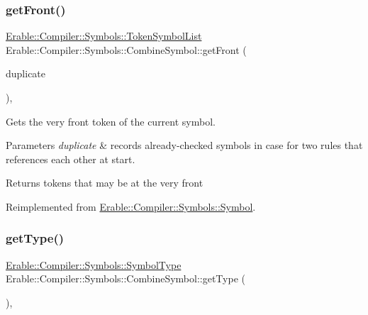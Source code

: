 \mbox{\label{struct_erable_1_1_compiler_1_1_symbols_1_1_combine_symbol_a453595cfd8eecc98d7d6589d78068f1a}} 
\subsubsection{\texorpdfstring{getFront()}{getFirst()}}
{\footnotesize\ttfamily \mbox{\hyperlink{namespace_erable_1_1_compiler_1_1_symbols_aff1ccebebde106c3c5f3cdca118a1d69}{Erable\+::\+Compiler\+::\+Symbols\+::\+Token\+Symbol\+List}} Erable\+::\+Compiler\+::\+Symbols\+::\+Combine\+Symbol\+::get\+Front (\begin{DoxyParamCaption}\item[{\mbox{\hyperlink{namespace_erable_1_1_compiler_1_1_symbols_a63e8157d2f729d4689d27bacad42f8ed}{Symbol\+List}} \&}]{duplicate }\end{DoxyParamCaption})\hspace{0.3cm}{\ttfamily [override]}, {\ttfamily [virtual]}}

Gets the very front token of the current symbol. 
\begin{DoxyParams}{Parameters}
{\em duplicate} & records already-\/checked symbols in case for two rules that references each other at start. \\
\hline
\end{DoxyParams}
\begin{DoxyReturn}{Returns}
tokens that may be at the very front 
\end{DoxyReturn}


Reimplemented from \mbox{\hyperlink{class_erable_1_1_compiler_1_1_symbols_1_1_symbol_a59ebadb3a895ead008c23e71ac1dbc06}{Erable\+::\+Compiler\+::\+Symbols\+::\+Symbol}}.

\mbox{\label{struct_erable_1_1_compiler_1_1_symbols_1_1_combine_symbol_a416d89f88e2708deeaee33425849ae4a}} 
\subsubsection{\texorpdfstring{getType()}{getType()}}
{\footnotesize\ttfamily \mbox{\hyperlink{namespace_erable_1_1_compiler_1_1_symbols_a3b60ec10cda0920ec4368128361b8320}{Erable\+::\+Compiler\+::\+Symbols\+::\+Symbol\+Type}} Erable\+::\+Compiler\+::\+Symbols\+::\+Combine\+Symbol\+::get\+Type (\begin{DoxyParamCaption}{ }\end{DoxyParamCaption})\hspace{0.3cm}{\ttfamily [override]}, {\ttfamily [virtual]}}



